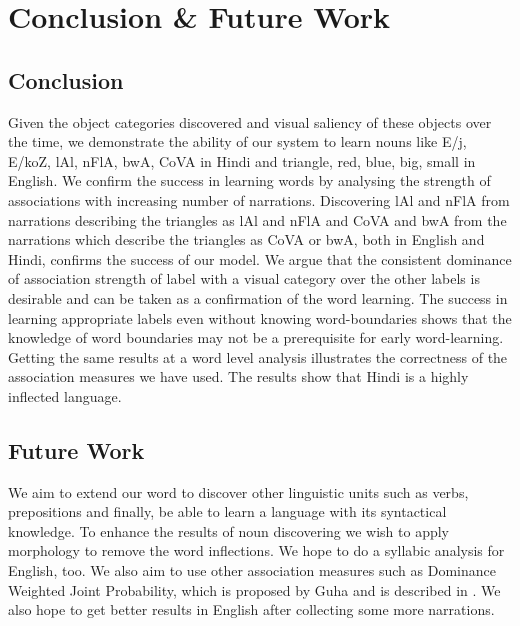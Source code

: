 \documentclass[12pt, a4paper]{report}
\begin{document}
\chapter{Conclusion \& Future Work}
\section{Conclusion}
Given the object categories discovered and visual saliency of these objects over the time, we demonstrate the ability of our system to learn nouns like {\dn E/j}, {\dn E/koZ}, {\dn lAl}, {\dn nFlA}, {\dn bwA}, {\dn CoVA} in Hindi and  triangle, red, blue, big, small in English. We confirm the success in learning words by analysing the strength of associations with increasing number of narrations. Discovering {\dn lAl} and {\dn nFlA} from narrations describing the triangles as {\dn lAl} and {\dn nFlA} and {\dn CoVA} and {\dn bwA} from the narrations which describe the triangles as {\dn CoVA} or {\dn bwA}, both in English and Hindi, confirms the success of our model. We argue that the consistent dominance of association strength of label with a visual category over the other labels is desirable and can be taken as a confirmation of the word learning. The success in learning appropriate labels even without knowing word-boundaries shows that the knowledge of word boundaries may not be a prerequisite for early word-learning. Getting the same results at a word level analysis illustrates the correctness of the association measures we have used. The results show that Hindi is a highly inflected language.
\section{Future Work}
We aim to extend our word to discover other linguistic units such as verbs, prepositions and finally, be able to learn a language with its syntactical knowledge. To enhance the results of noun discovering we wish to apply morphology to remove the word inflections. We hope to do a syllabic analysis for English, too. We also aim to use other association measures such as Dominance Weighted Joint Probability, which is proposed by Guha and is described in \cite{guha}. We also hope to get better results in English after collecting some more narrations.
\end{document}
